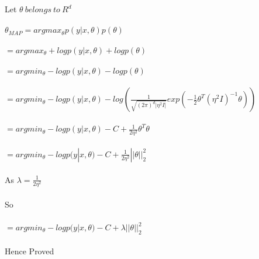 \newcommand\tab[1][1cm]{\hspace*{#1}}
\begin{answer}
\\ \\
Let $\theta \ belongs \ to \ R^d$ \\ \\
\tab$ \theta_{MAP} = argmax_{\theta}p(y|x,\theta)p(\theta)$ \\ \\
\tab[2cm]$ = argmax_{\theta}+logp(y|x,\theta)+logp(\theta)$ \\ \\
\tab[2cm]$ = argmin_{\theta}-logp(y|x,\theta)-logp(\theta)$ \\ \\
\tab[2cm]$ = argmin_{\theta}-logp(y|x,\theta)-log(\frac{1}{\sqrt{(2\pi)^d|\eta^2I|}}exp(-\frac{1}{2}\theta^T(\eta^2I)^{-1}\theta))  $ \\ \\
\tab[2cm]$ = argmin_{\theta}-logp(y|x,\theta)-C+\frac{1}{2\eta^2} \theta^T \theta $ \\ \\
\tab[2cm]$ = argmin_{\theta}-logp(y|x,\theta)-C+\frac{1}{2\eta^2} ||\theta||_2^2 $ \\ \\
As $\lambda = \frac{1}{2\eta^2}$ \\ \\
So \\ \\
\tab[2cm]$ = argmin_{\theta}-logp(y|x,\theta)-C+\lambda ||\theta||_2^2 $ \\ \\
Hence Proved \\ \\
\end{answer}
